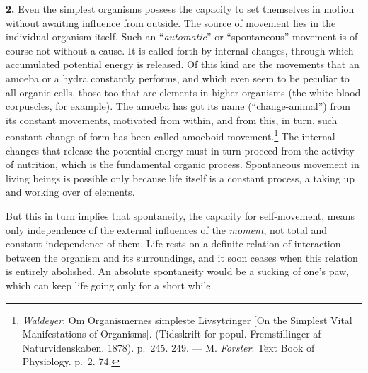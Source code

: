 \documentclass[12pt,a4paper]{book}
\newcommand{\opage}[1]{\marginnote{\footnotesize\textit{[#1]}}}
\begin{document}
\textbf{2.} Even the simplest organisms possess the capacity to set
themselves in motion without awaiting influence from outside. The source
of movement lies in the individual organism itself. Such an
``\emph{automatic}'' or ``spontaneous'' movement is of course not without a
cause. It is called forth by internal
\opage{366}changes, through which accumulated potential energy is released.
Of this kind are the movements that an amoeba or a hydra constantly
performs, and which even seem to be peculiar to all organic cells, those
too that are elements in higher organisms (the white blood corpuscles, for
example). The amoeba has got its name (``change-animal'') from its
constant movements, motivated from within, and from this, in turn, such
constant change of form has been called amoeboid
movement.\footnote{\emph{Waldeyer}: Om Organismernes simpleste
Livsytringer [On the Simplest Vital Manifestations of Organisms].
(Tidsskrift for popul. Fremstillinger af Naturvidenskaben. 1878).
p.~245. 249. --- M. \emph{Forster}: Text Book of Physiology. p.~2. 74.}
The internal changes that release the potential energy must in turn
proceed from the activity of nutrition, which is the fundamental organic
process. Spontaneous movement in living beings is possible only because
life itself is a constant process, a taking up and working over of
elements.

But this in turn implies that spontaneity, the capacity for
self-movement, means only independence of the external influences of the
\emph{moment}, not total and constant independence of them. Life rests on
a definite relation of interaction between the organism and its
surroundings, and it soon ceases when this relation is entirely
abolished. An absolute spontaneity would be a sucking of one's paw, which
can keep life going only for a short while.
\end{document}
